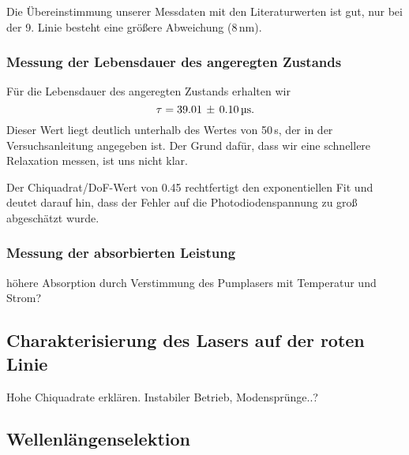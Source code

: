 Die Übereinstimmung unserer Messdaten mit den Literaturwerten ist gut,
nur bei der 9. Linie besteht eine größere Abweichung (8\,nm).



\subsubsection{Messung der Lebensdauer des angeregten Zustands}

Für die Lebensdauer des angeregten Zustands erhalten wir
\begin{equation*}
\tau = 39.01\,\pm\,0.10\,\text{\textmu s}.
\end{equation*}
Dieser Wert liegt deutlich unterhalb des Wertes von 50\,\textmu s,
der in der Versuchsanleitung angegeben ist.
Der Grund dafür, dass wir eine schnellere Relaxation messen, ist uns nicht klar.

Der Chiquadrat/DoF-Wert von 0.45 rechtfertigt den exponentiellen Fit und deutet darauf hin,
dass der Fehler auf die Photodiodenspannung zu groß abgeschätzt wurde.

\subsubsection{Messung der absorbierten Leistung}

höhere Absorption durch Verstimmung des Pumplasers mit Temperatur und Strom?

\subsection{Charakterisierung des Lasers auf der roten Linie}
Hohe Chiquadrate erklären. Instabiler Betrieb, Modensprünge..?


\subsection{Wellenlängenselektion}